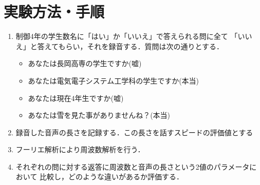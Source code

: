 \documentclass[titlepage]{jarticle}
\begin{document}
\section{実験方法・手順}
\begin{enumerate}
  \item 制御4年の学生数名に「はい」か「いいえ」で答えられる問に全て
        「いいえ」と答えてもらい，それを録音する．質問は次の通りとする．
        \begin{itemize}
          \item あなたは長岡高専の学生ですか(嘘)
          \item あなたは電気電子システム工学科の学生ですか(本当)
          \item あなたは現在4年生ですか(嘘)
          \item あなたは雪を見た事がありませんね？(本当)
        \end{itemize}
  \item 録音した音声の長さを記録する．この長さを話すスピードの評価値とする
  \item フーリエ解析により周波数解析を行う．
  \item それぞれの問に対する返答に周波数と音声の長さという2値のパラメータにおいて
        比較し，どのような違いがあるか評価する．
\end{enumerate}
\end{document}
